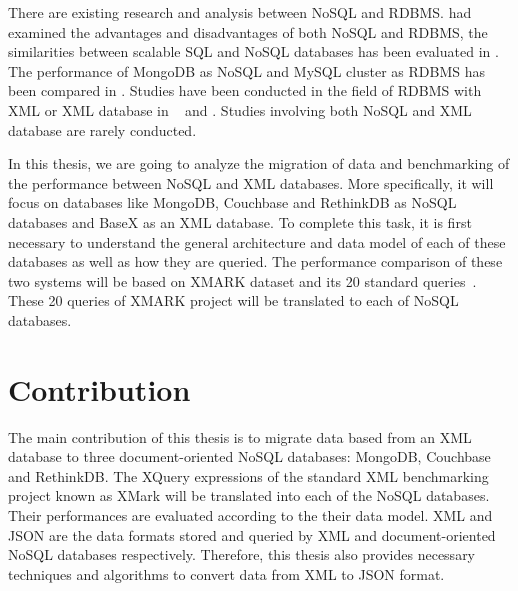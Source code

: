 	\par		
	There are existing research and analysis between NoSQL and RDBMS. \citet{nance2013nosql} had examined the advantages and disadvantages of both NoSQL and RDBMS, the similarities between scalable SQL and NoSQL databases has been evaluated in \cite{cattell2011scalable}. The performance of MongoDB as NoSQL and MySQL cluster as  RDBMS has been compared in   \cite{hadjigeorgiou2013rdbms}.   Studies have been conducted in the field of RDBMS with XML or XML database in  ~\cite{jiang2002xparent} and \cite{shanmugasundaram1999relational}. Studies involving both NoSQL and XML database are rarely conducted.
\par
In this thesis, we are going to analyze the migration of data and benchmarking of the performance between NoSQL and XML databases. More specifically, it will focus on databases like MongoDB, Couchbase and RethinkDB as NoSQL databases and BaseX as an XML database. To complete this task, it is first necessary to understand the general architecture and data model of each of these databases as well as how they are queried. The performance comparison of these two systems will be based on XMARK dataset and its 20 standard queries~\citep{xmark/original}. These 20 queries of XMARK project will be translated to each of NoSQL databases.
	
	\section{Contribution}
		The main contribution of this thesis is to migrate data based from an XML database to three document-oriented NoSQL databases: MongoDB, Couchbase and RethinkDB. The XQuery expressions of the standard XML benchmarking project known as XMark will be  translated  into each of the NoSQL databases. Their performances are  evaluated according to the their data model. XML and JSON are the data formats stored and queried by XML and document-oriented NoSQL databases respectively. Therefore, this thesis also provides necessary techniques and algorithms to convert data from XML to JSON format.
	    
		

